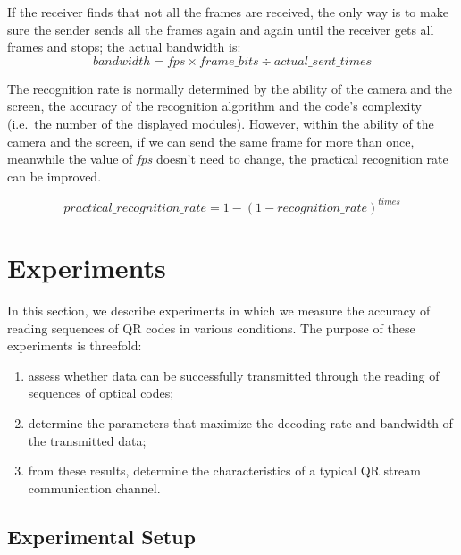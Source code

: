 If the receiver finds that not all the frames are received, the only way is to make sure the sender sends all the frames again and again until the receiver gets all frames and stops; the actual bandwidth is:
%
\begin{equation*}
  bandwidth = \mathit{fps} \times \mathit{frame\_bits} \div \mathit{actual\_sent\_times}
\end{equation*}

The recognition rate is normally determined by the ability of the camera and the screen, the accuracy of the recognition algorithm and the code's complexity (i.e.\ the number of the displayed modules). However, within the ability of the camera and the screen, if we can send the same frame for more than once, meanwhile the value of \emph{fps} doesn't need to change, the practical recognition rate can be improved.

\begin{equation*}
\mathit{practical\_recognition\_rate} = 1 - (1 - \mathit{recognition\_rate})^{times}
\end{equation*}



\section{Experiments}\label{sec:qr:experiments} %

In this section, we describe experiments in which we measure the accuracy of reading sequences of QR codes in various conditions. The purpose of these experiments is threefold:

\begin{enumerate}
\item assess whether data can be successfully transmitted through the reading of sequences of optical codes;
\item determine the parameters that maximize the decoding rate and bandwidth of the transmitted data;
\item from these results, determine the characteristics of a typical QR stream communication channel.
\end{enumerate}

\subsection{Experimental Setup}

